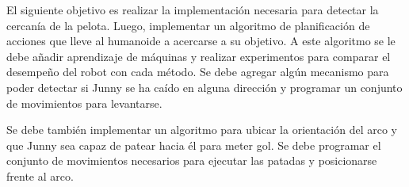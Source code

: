 El siguiente objetivo es realizar la implementación necesaria para detectar la cercanía de la pelota. Luego, implementar un algoritmo de planificación de acciones que lleve al humanoide a acercarse a su objetivo. A este algoritmo se le debe añadir aprendizaje de máquinas y realizar experimentos para comparar el desempeño del robot con cada método. Se debe agregar algún mecanismo para poder detectar si Junny se ha caído en alguna dirección y programar un conjunto de movimientos para levantarse.   

Se debe también implementar un algoritmo para ubicar la orientación del arco y que Junny sea capaz de patear hacia él para meter gol. Se debe programar el conjunto de movimientos necesarios para ejecutar las patadas y posicionarse frente al arco. 




    
